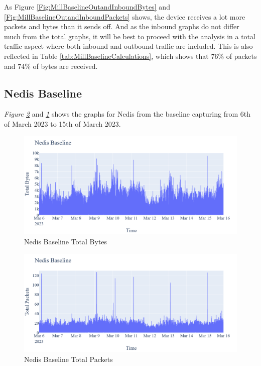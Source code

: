 As Figure \ref{Fig:MillBaselineOutandInboundBytes} and \ref{Fig:MillBaselineOutandInboundPackets} shows, the device receives a lot more packets and bytes than it sends off. And as the inbound graphs do not differ much from the total graphs, it will be best to proceed with the analysis in a total traffic aspect where both inbound and outbound traffic are included. This is also reflected in Table \ref{tab:MillBaselineCalculations}, which shows that 76\% of packets and 74\% of bytes are received.

\subsection{Nedis Baseline}
\textit{Figure \ref{fig:NedisBaselineTotalPackets}} and \textit{\ref{fig:NedisBaselineTotalBytes}} shows the graphs for Nedis from the baseline capturing from 6th of March 2023 to 15th of March 2023. 
\begin{figure} [H]
    \centering
    \includegraphics[scale=0.3]{figures/Nedis_Baseline_TotalBytes.png}
    \caption{Nedis Baseline Total Bytes}
    \label{fig:NedisBaselineTotalBytes}
\end{figure}

\begin{figure} [H]         
    \includegraphics[scale=0.3]{figures/Nedis_Baseline_TotalPackets.png}
    \caption{Nedis Baseline Total Packets}
    \label{fig:NedisBaselineTotalPackets}
 \end{figure}

